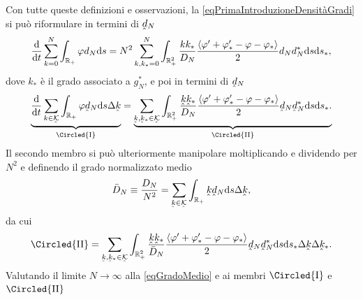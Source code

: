             Con tutte queste definizioni e osservazioni, la \cref{eqPrimaIntroduzioneDensitàGradi} si può riformulare in termini di \(\underhat d_N\)
            \begin{equation*}
                \frac{\mathrm{d}}{\mathrm{d}t}\sum_{k=0}^N\int_{\mathbb R_+}\varphi d_N\mathrm{d} s=
                N^2\sum_{k,k_*=0}^N\int_{\mathbb R_+^2}\frac{kk_*}{D_N}
                \frac{\langle\varphi'+\varphi'_*-\varphi-\varphi_*\rangle}2
                d_Nd^*_N\mathrm{d} s\mathrm{d} s_*,
            \end{equation*}
            dove \(k_*\) è il grado associato a \(g_N^*\), e poi in termini di \(\underhat d_N\)
            \begin{equation*}
                \underbrace{
                    \derS{}t\sum_{k\in\underhat{\mathcal K}}\int_{\RPlus}\varphi\underhat d_N\de s\Delta\underhat k
                    \vphantom{\frac{\langle\varphi'+\varphi'_*-\varphi-\varphi_*\rangle}{2D_N}}
                }_{\Circled{\mathrm{I}}} =
                \underbrace{
                    \sum_{\underhat k,\underhat k_*\in\underhat{\mathcal K}}\int_{\RPlus^2}
                    \frac{\underhat k\underhat k_*}{D_N}
                    \frac{\langle\varphi'+\varphi'_*-\varphi-\varphi_*\rangle}2
                    \underhat d_N\underhat d^*_N\de s\de s_*.
                }_{\Circled{\mathrm{II}}}
            \end{equation*}
            Il secondo membro si può ulteriormente manipolare moltiplicando e dividendo per \(N^2\) e definendo il grado normalizzato medio
            \begin{equation}
                \label{eqGradoMedio}
                \bar D_N\equiv\frac{D_N}{N^2}=
                \sum_{\underhat k\in\underhat{\mathcal K}}
                \int_{\RPlus}\underhat k\underhat d_N\de s\Delta\underhat k,
            \end{equation}
            da cui
            \begin{equation*}
                \Circled{\mathrm{II}}=
                \sum_{\underhat k,\underhat k_*\in\underhat{\mathcal K}}\int_{\RPlus^2}\frac{\underhat k\underhat k_*}{\bar D_N}
                \frac{\langle\varphi'+\varphi'_*-\varphi-\varphi_*\rangle}2
                \underhat d_N\underhat d^*_N\de s\de s_*\Delta\underhat k\Delta\underhat k_*.
            \end{equation*}
            Valutando il limite \(N\to\infty\) alla \cref{eqGradoMedio} e ai membri \(\Circled{\mathrm I}\) e \(\Circled{\mathrm{II}}\)
